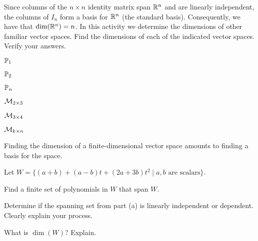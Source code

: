 \begin{activity} \label{act:5_c_1} Since columns of the $n \times n$ identity matrix span $\mathbb{R}^n $ and are linearly independent, the columns of $I_n$ form a basis for $\mathbb{R}^n$ (the standard basis). Consequently, we have that $\dim(\mathbb{R}^n) = n$. In this activity we determine the dimensions of other familiar vector spaces. Find the dimensions of each of the indicated vector spaces. Verify your answers.
	\ba
	\begin{minipage}{1.5in}
	\item $\mathbb{P}_1$
	\end{minipage}
	\begin{minipage}{1.5in}
	\item $\mathbb{P}_2$
	\end{minipage}
	\begin{minipage}{1.5in}
	\item $\mathbb{P}_n$
	\end{minipage}
	
	\begin{minipage}{1.5in}
	\item $\mathcal{M}_{2 \times 3}$
	\end{minipage}
	\begin{minipage}{1.5in}
	\item $\mathcal{M}_{3 \times 4}$
	\end{minipage}
	\begin{minipage}{1.5in}
	\item $\mathcal{M}_{k \times n}$
	\end{minipage}

\ea


\end{activity}

Finding the dimension of a finite-dimensional vector space amounts to finding a basis for the space. 

\begin{activity} \label{act:5_c_2}  Let $W = \{(a+b) + (a-b)t + (2a+3b)t^2 \mid a, b \text{ are scalars}\}$. 
	\ba
	\item Find a finite set of polynomials in $W$ that span $W$. 


	\item Determine if the spanning set from part (a) is linearly independent or dependent. Clearly explain your process. 
		
	
	\item What is $\dim(W)$? Explain.
	
	\ea
	
\end{activity}

